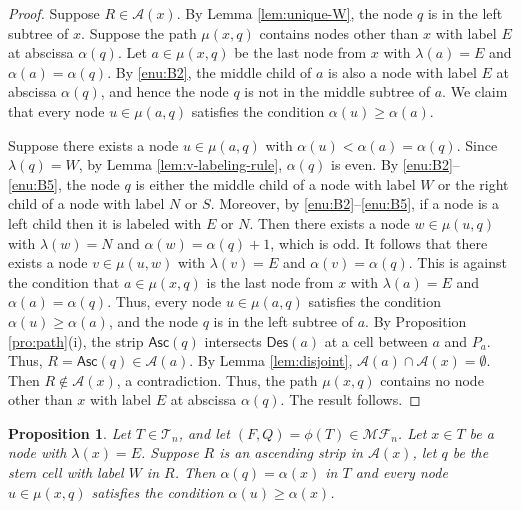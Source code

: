 \documentclass[a4paper,11pt,reqno]{amsart}
\newtheorem{pro}[lem]{Proposition}
\theoremstyle{definition}
\numberwithin{equation}{section}
\newcommand{\A}{{\mathcal{A}}}
\newcommand{\Des}{{\textsf{Des}}}
\newcommand{\Asc}{{\textsf{Asc}}}
\newcommand{\MF}{{\mathcal{MF}}}
\newcommand{\T}{{\mathcal{T}}}
\begin{document}
\begin{proof} 
Suppose $R\in\A(x)$. By Lemma \ref{lem:unique-W}, the node $q$ is in the left subtree of $x$. Suppose the path $\mu(x,q)$ contains nodes other than $x$ with label $E$ at abscissa $\alpha(q)$. Let $a\in\mu(x,q)$ be the last node from $x$ with $\lambda(a)=E$ and $\alpha(a)=\alpha(q)$. By \ref{enu:B2}, the middle child of $a$ is also a node with label $E$ at abscissa $\alpha(q)$, and hence the node $q$ is not in the middle subtree of $a$. 
We claim that every node $u\in\mu(a,q)$ satisfies the condition $\alpha(u)\geq \alpha(a)$. 

Suppose there exists a node $u\in\mu(a,q)$ with $\alpha(u)<\alpha(a)=\alpha(q)$. Since $\lambda(q)=W$, by Lemma \ref{lem:v-labeling-rule}, $\alpha(q)$ is even.
By \ref{enu:B2}--\ref{enu:B5}, the node $q$ is either the middle child of a node with label $W$ or the right child of a node with label $N$ or $S$. Moreover, by \ref{enu:B2}--\ref{enu:B5}, if a node is a left child then it is labeled with $E$ or $N$.
Then there exists a node $w\in\mu(u,q)$ with $\lambda(w)=N$ and $\alpha(w)=\alpha(q)+1$, which is odd. It follows that there exists a node $v\in\mu(u,w)$ with $\lambda(v)=E$ and $\alpha(v)=\alpha(q)$. This is against the condition that $a\in\mu(x,q)$ is the last node from $x$ with $\lambda(a)=E$ and $\alpha(a)=\alpha(q)$. Thus, every node $u\in\mu(a,q)$ satisfies the condition $\alpha(u)\geq \alpha(a)$, and the node $q$ is in the left subtree of $a$. By Proposition \ref{pro:path}(i), the strip $\Asc(q)$ intersects $\Des(a)$ at a cell between $a$ and $P_a$. Thus, $R=\Asc(q)\in\A(a)$. By Lemma \ref{lem:disjoint}, $\A(a)\cap\A(x)=\emptyset$. Then $R\not\in\A(x)$, a contradiction.  Thus, the path $\mu(x,q)$ contains no node other than $x$ with label $E$ at abscissa $\alpha(q)$. The result follows. 
\end{proof}

\smallskip
\begin{pro} \label{pro:alpha(q)=alpha(x)}
Let $T\in\T_n$, and let $(F,Q)=\phi(T)\in\MF_n$. Let $x\in T$ be a node with $\lambda(x)=E$. Suppose $R$ is an ascending strip in $\A(x)$, let $q$ be the stem cell with label $W$ in $R$. Then $\alpha(q)=\alpha(x)$ in $T$ and every node $u\in\mu(x,q)$ satisfies the condition $\alpha(u)\ge \alpha(x)$.
\end{pro}
\end{document}
